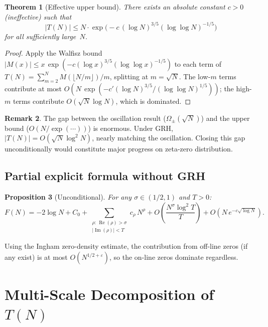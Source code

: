 \documentclass[11pt]{article}
\newtheorem{theorem}{Theorem}[section]
\newtheorem{proposition}[theorem]{Proposition}
\theoremstyle{definition}
\newtheorem{remark}[theorem]{Remark}
\begin{document}
\begin{theorem}[Effective upper bound]\label{thm:effective-bound}
There exists an absolute constant $c > 0$ \textup{(ineffective)} such
that
\[
  |T(N)| \le N \cdot \exp\!\bigl(-c\,(\log N)^{3/5}
  (\log\log N)^{-1/5}\bigr)
\]
for all sufficiently large~$N$.
\end{theorem}

\begin{proof}
Apply the Walfisz bound $|M(x)| \le x\,\exp(-c(\log x)^{3/5}
(\log\log x)^{-1/5})$ to each term of
$T(N) = \sum_{m=2}^{N} M(\lfloor N/m \rfloor)/m$, splitting at
$m = \sqrt{N}$.  The low-$m$ terms contribute at most
$O(N\,\exp(-c'(\log N)^{3/5}/(\log\log N)^{1/5}))$; the high-$m$
terms contribute $O(\sqrt{N}\log N)$, which is dominated.
\end{proof}

\begin{remark}
The gap between the oscillation result ($\Omega_\pm(\sqrt{N})$)
and the upper bound ($O(N/\exp(\cdots))$) is enormous.  Under GRH,
$|T(N)| = O(\sqrt{N}\log^2 N)$, nearly matching the oscillation.
Closing this gap unconditionally would constitute major progress on
zeta-zero distribution.
\end{remark}

\subsection{Partial explicit formula without GRH}

\begin{proposition}[Unconditional]\label{prop:partial-explicit}
For any $\sigma \in (1/2, 1)$ and $T > 0$:
\[
  F(N) = -2\log N + C_0
  + \!\!\!\sum_{\substack{\rho :\, \operatorname{Re}(\rho) > \sigma \\
  |\operatorname{Im}(\rho)| < T}} \!\!\! c_\rho\,N^\rho
  + O\!\left(\frac{N^\sigma \log^2 T}{T}\right)
  + O(N\,e^{-c\sqrt{\log N}}).
\]
\end{proposition}

Using the Ingham zero-density estimate, the contribution from
off-line zeros (if any exist) is at most $O(N^{1/2+\varepsilon})$,
so the on-line zeros dominate regardless.



\section{Multi-Scale Decomposition of $T(N)$}\label{sec:multiscale}
\end{document}
